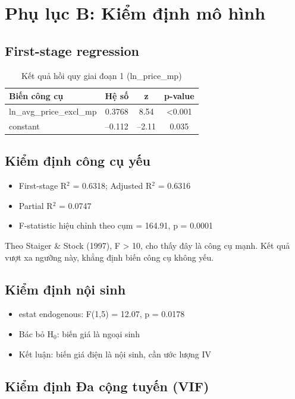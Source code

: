 \documentclass[12pt,a4paper,oneside]{article}
\begin{document}
\section{Phụ lục B: Kiểm định mô hình}
\subsection{First-stage regression}
\begin{table}[H]
	\centering
	\caption{Kết quả hồi quy giai đoạn 1 (ln\_price\_mp)}
	\begin{tabular}{l c c c}
		\toprule
		Biến công cụ & Hệ số & z & p-value \\
		\midrule
		ln\_avg\_price\_excl\_mp & 0.3768 & 8.54 & <0.001 \\
		constant & –0.112 & –2.11 & 0.035 \\
		\bottomrule
	\end{tabular}
\end{table}

\subsection{Kiểm định công cụ yếu}
\begin{itemize}
	\item First-stage R$^2$ = 0.6318; Adjusted R$^2$ = 0.6316
	\item Partial R$^2$ = 0.0747
	\item F-statistic hiệu chỉnh theo cụm = 164.91, p = 0.0001
\end{itemize}
Theo Staiger \& Stock (1997), F > 10, cho thấy đây là công cụ mạnh. Kết quả vượt xa ngưỡng này, khẳng định biến công cụ không yếu.

\subsection{Kiểm định nội sinh}
\begin{itemize}
	\item estat endogenous: F(1,5) = 12.07, p = 0.0178
	\item Bác bỏ H$_0$: biến giá là ngoại sinh
	\item Kết luận: biến giá điện là nội sinh, cần ước lượng IV
\end{itemize}

\subsection{Kiểm định Đa cộng tuyến (VIF)}
\end{document}
